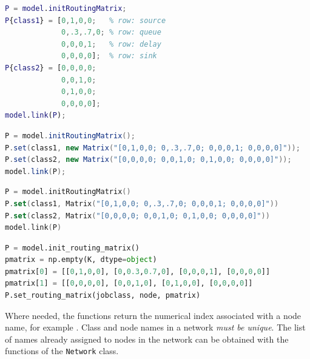 \begin{MATLAB}
\begin{lstlisting}[language = matlab]
P = model.initRoutingMatrix;
P{class1} = [0,1,0,0;   % row: source
             0,.3,.7,0; % row: queue
             0,0,0,1;   % row: delay
             0,0,0,0];  % row: sink
P{class2} = [0,0,0,0;
             0,0,1,0;
             0,1,0,0;
             0,0,0,0];
model.link(P);
\end{lstlisting}
\end{MATLAB}
\begin{JAVA}
\begin{lstlisting}[language = java, basicstyle=\ttfamily\scriptsize]
P = model.initRoutingMatrix();
P.set(class1, new Matrix("[0,1,0,0; 0,.3,.7,0; 0,0,0,1; 0,0,0,0]"));  
P.set(class2, new Matrix("[0,0,0,0; 0,0,1,0; 0,1,0,0; 0,0,0,0]"));
model.link(P);
\end{lstlisting}
\end{JAVA}
\begin{KOTLIN}
\begin{lstlisting}[language = kotlin, basicstyle=\ttfamily\scriptsize]
P = model.initRoutingMatrix()
P.set(class1, Matrix("[0,1,0,0; 0,.3,.7,0; 0,0,0,1; 0,0,0,0]"))  
P.set(class2, Matrix("[0,0,0,0; 0,0,1,0; 0,1,0,0; 0,0,0,0]"))
model.link(P)
\end{lstlisting}
\end{KOTLIN}
\begin{PYTHON}
\begin{lstlisting}[language = python]
P = model.init_routing_matrix()
pmatrix = np.empty(K, dtype=object)
pmatrix[0] = [[0,1,0,0], [0,0.3,0.7,0], [0,0,0,1], [0,0,0,0]]
pmatrix[1] = [[0,0,0,0], [0,0,1,0], [0,1,0,0], [0,0,0,0]]
P.set_routing_matrix(jobclass, node, pmatrix)
\end{lstlisting}
\end{PYTHON}
Where needed, the  functions return the numerical index associated with a node name, for example
. Class and node names in a network {\em must be unique}. The list of names already assigned to nodes in the network can be obtained with the  functions of the \texttt{Network} class.

